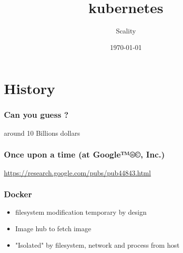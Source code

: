 \documentclass{beamer}
\title{kubernetes}
\author{Scality}
\date{\today}
\begin{document}
\maketitle{}

\section{History}

\begin{frame}
\frametitle{Can you guess ?}
\centering
\vfill
around 10 Billions dollars
\vfill
{}
\end{frame}

\begin{frame}
  \frametitle{Once upon a time (at Google{\tiny ™®©}, Inc.)}
  \begin{center}
  \href{https://research.google.com/pubs/pub44843.html}
       {https://research.google.com/pubs/pub44843.html}
  \vfill
  \end{center}
\end{frame}

\begin{frame}
  \frametitle{Docker}
  \begin{itemize}
    \item filesystem modification temporary by design
    \item Image hub to fetch image
    \item "Isolated" by filesystem, network and process from host
  \end{itemize}
\end{frame}
\end{document}
